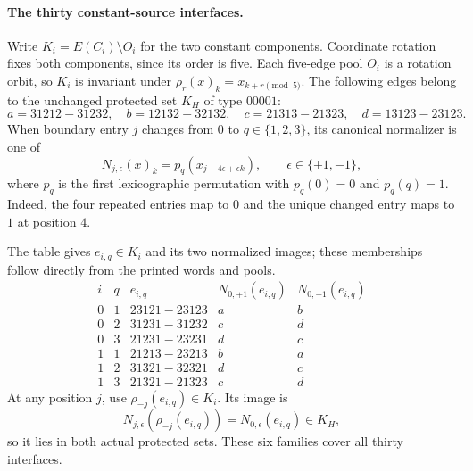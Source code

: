 \documentclass[11pt]{article}
\theoremstyle{remark}
\numberwithin{equation}{section}
\numberwithin{table}{section}
\begin{document}
\paragraph{The thirty constant-source interfaces.}
Write $K_i=E(C_i)\setminus O_i$ for the two constant components.
Coordinate rotation fixes both components, since its order is five.
Each five-edge pool $O_i$ is a rotation orbit, so $K_i$ is invariant
under $\rho_r(x)_k=x_{k+r\pmod5}$. The following edges belong to
the unchanged protected set $K_H$ of type $00001$:
\[
a=31212\!-31232,\quad b=12132\!-32132,\quad
c=21313\!-21323,\quad d=13123\!-23123.
\]
When boundary entry $j$ changes from $0$ to $q\in\{1,2,3\}$,
its canonical normalizer is one of
\[
 N_{j,\epsilon}(x)_k=p_q(x_{j-4\epsilon+\epsilon k}),
 \qquad \epsilon\in\{+1,-1\},
\]
where $p_q$ is the first lexicographic permutation with $p_q(0)=0$
and $p_q(q)=1$. Indeed, the four repeated entries map to $0$ and
the unique changed entry maps to $1$ at position $4$.
\par{}
The table gives $e_{i,q}\in K_i$ and its two normalized images;
these memberships follow directly from the printed words and pools.
\[
\begin{array}{cc|c|cc}
i&q&e_{i,q}&N_{0,+1}(e_{i,q})&N_{0,-1}(e_{i,q})\\ \hline
0&1&23121\!-23123&a&b\\
0&2&31231\!-31232&c&d\\
0&3&21231\!-23231&d&c\\
1&1&21213\!-23213&b&a\\
1&2&31321\!-32321&d&c\\
1&3&21321\!-21323&c&d
\end{array}
\]
At any position $j$, use $\rho_{-j}(e_{i,q})\in K_i$. Its image is
\[
 N_{j,\epsilon}(\rho_{-j}(e_{i,q}))
      =N_{0,\epsilon}(e_{i,q})\in K_H,
\]
so it lies in both actual protected sets. These six families cover
all thirty interfaces.
\end{document}
